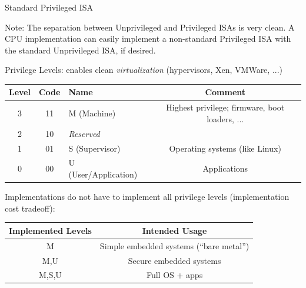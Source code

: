 \documentclass{article}
\newcommand{\hmm}{\hspace*{2em}}
\begin{document}
\clearpage


\begin{center}
  {\Huge
    Standard Privileged ISA}

  \vspace*{0.5in}

  \begin{minipage}{9in}\LARGE
    {\Large Note: The separation between Unprivileged and Privileged ISAs is very
    clean.  A CPU implementation can easily implement a non-standard
    Privileged ISA with the standard Unprivileged ISA, if desired.}

    \vspace{0.5in}

    Privilege Levels: enables clean \emph{virtualization} (hypervisors, Xen, VMWare, ...)

    \begin{center}
      \begin{tabular}{|c|c|l|c|}
        \hline
        Level & Code & Name                 & Comment \\
        \hline
        3     & 11   & M (Machine)          & Highest privilege; firmware, boot loaders, ... \\
        2     & 10   & \hmm \emph{Reserved} & \\
        1     & 01   & S (Supervisor)       & Operating systems (like Linux) \\
        0     & 00   & U (User/Application) & Applications \\
        \hline
      \end{tabular}
    \end{center}

    \vspace{0.5in}

    Implementations do not have to implement all privilege levels
    (implementation cost tradeoff):

    \begin{center}
      \begin{tabular}{|c|c|}
        \hline
        Implemented Levels & Intended Usage \\
        \hline
        M                  &   Simple embedded systems (``bare metal'') \\
        M,U                &   Secure embedded systems \\
        M,S,U              &   Full OS + apps \\
        \hline
      \end{tabular}
    \end{center}
  \end{minipage}

\end{center}
\end{document}
